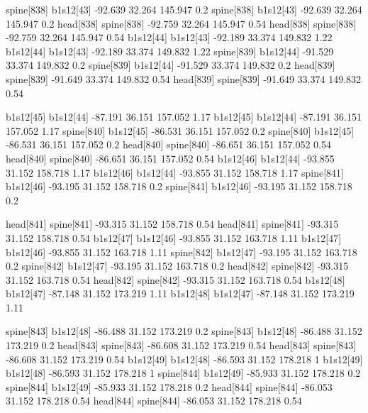 spine[838]    b1s12[43]    -92.639    32.264    145.947    0.2
spine[838]    b1s12[43]    -92.639    32.264    145.947    0.2
head[838]    spine[838]    -92.759    32.264    145.947    0.54
head[838]    spine[838]    -92.759    32.264    145.947    0.54
b1s12[44]    b1s12[43]    -92.189    33.374    149.832    1.22
b1s12[44]    b1s12[43]    -92.189    33.374    149.832    1.22
spine[839]    b1s12[44]    -91.529    33.374    149.832    0.2
spine[839]    b1s12[44]    -91.529    33.374    149.832    0.2
head[839]    spine[839]    -91.649    33.374    149.832    0.54
head[839]    spine[839]    -91.649    33.374    149.832    0.54


b1s12[45]    b1s12[44]    -87.191    36.151    157.052    1.17
b1s12[45]    b1s12[44]    -87.191    36.151    157.052    1.17
spine[840]    b1s12[45]    -86.531    36.151    157.052    0.2
spine[840]    b1s12[45]    -86.531    36.151    157.052    0.2
head[840]    spine[840]    -86.651    36.151    157.052    0.54
head[840]    spine[840]    -86.651    36.151    157.052    0.54
b1s12[46]    b1s12[44]    -93.855    31.152    158.718    1.17
b1s12[46]    b1s12[44]    -93.855    31.152    158.718    1.17
spine[841]    b1s12[46]    -93.195    31.152    158.718    0.2
spine[841]    b1s12[46]    -93.195    31.152    158.718    0.2


head[841]    spine[841]    -93.315    31.152    158.718    0.54
head[841]    spine[841]    -93.315    31.152    158.718    0.54
b1s12[47]    b1s12[46]    -93.855    31.152    163.718    1.11
b1s12[47]    b1s12[46]    -93.855    31.152    163.718    1.11
spine[842]    b1s12[47]    -93.195    31.152    163.718    0.2
spine[842]    b1s12[47]    -93.195    31.152    163.718    0.2
head[842]    spine[842]    -93.315    31.152    163.718    0.54
head[842]    spine[842]    -93.315    31.152    163.718    0.54
b1s12[48]    b1s12[47]    -87.148    31.152    173.219    1.11
b1s12[48]    b1s12[47]    -87.148    31.152    173.219    1.11


spine[843]    b1s12[48]    -86.488    31.152    173.219    0.2
spine[843]    b1s12[48]    -86.488    31.152    173.219    0.2
head[843]    spine[843]    -86.608    31.152    173.219    0.54
head[843]    spine[843]    -86.608    31.152    173.219    0.54
b1s12[49]    b1s12[48]    -86.593    31.152    178.218    1
b1s12[49]    b1s12[48]    -86.593    31.152    178.218    1
spine[844]    b1s12[49]    -85.933    31.152    178.218    0.2
spine[844]    b1s12[49]    -85.933    31.152    178.218    0.2
head[844]    spine[844]    -86.053    31.152    178.218    0.54
head[844]    spine[844]    -86.053    31.152    178.218    0.54


